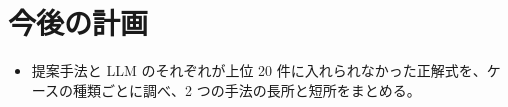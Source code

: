 \documentclass[a4j,dvipdfmx,10pt]{jresume}
\begin{document}
\section{今後の計画}\label{sec:plan}
\begin{itemize}[leftmargin=1.5em]
  \item 提案手法と LLM のそれぞれが上位 20 件に入れられなかった正解式を、ケースの種類ごとに調べ、2 つの手法の長所と短所をまとめる。
\end{itemize}






\appendix
\def\thesection{Appendix \Alph{section}}
\end{document}
